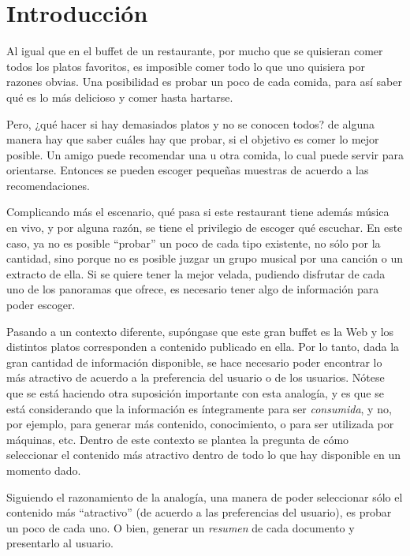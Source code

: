 \chapter{Introducción}
\label{sec-1}


  Al igual que en el buffet de un restaurante, por mucho que se quisieran
  comer todos los platos favoritos, es imposible comer todo lo que uno
  quisiera por razones obvias. Una posibilidad es probar un poco de cada
  comida, para así saber qué es lo más delicioso y comer hasta
  hartarse.

  Pero, ¿qué hacer si hay demasiados platos y no se conocen todos? de
  alguna manera hay que saber cuáles hay que probar, si el objetivo es
  comer lo mejor posible. Un amigo puede recomendar una u otra comida,
  lo cual puede servir para orientarse. Entonces se pueden escoger
  pequeñas muestras de acuerdo a las recomendaciones.

  Complicando más el escenario, qué pasa si este restaurant tiene
  además música en vivo, y por alguna razón, se tiene el privilegio de
  escoger qué escuchar. En este caso, ya no es posible ``probar'' un
  poco de cada tipo existente, no sólo por la cantidad, sino porque no
  es posible juzgar un grupo musical por una canción o un extracto de
  ella. Si se quiere tener la mejor velada, pudiendo disfrutar de cada
  uno de los panoramas que ofrece, es necesario tener algo de
  información para poder escoger.

  Pasando a un contexto diferente, supóngase que este gran buffet es la
  Web y los distintos platos corresponden a contenido publicado en
  ella. Por lo tanto, dada la gran cantidad de información disponible,
  se hace necesario poder encontrar lo más atractivo de acuerdo a la
  preferencia del usuario o de los usuarios. Nótese que se está
  haciendo otra suposición importante con esta analogía, y es que se
  está considerando que la información es íntegramente para ser
  \emph{consumida}, y no, por ejemplo, para generar más contenido,
  conocimiento, o para ser utilizada por máquinas, etc. Dentro de
  este contexto se plantea la pregunta de cómo seleccionar el contenido
  más atractivo dentro de todo lo que hay disponible en un momento dado.

  Siguiendo el razonamiento de la analogía, una manera de poder
  seleccionar sólo el contenido más ``atractivo'' (de acuerdo a las
  preferencias del usuario), es probar un poco de cada uno. O bien,
  generar un \emph{resumen} de cada documento y presentarlo al usuario.

